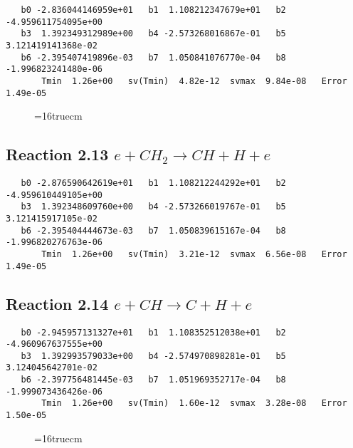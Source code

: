 \documentclass[12pt]{article}
\begin{document}
\begin{small}\begin{verbatim} 
   b0 -2.836044146959e+01   b1  1.108212347679e+01   b2 -4.959611754095e+00
   b3  1.392349312989e+00   b4 -2.573268016867e-01   b5  3.121419141368e-02
   b6 -2.395407419896e-03   b7  1.050841076770e-04   b8 -1.996823241480e-06
       Tmin  1.26e+00   sv(Tmin)  4.82e-12  svmax  9.84e-08   Error  1.49e-05
\end{verbatim}\end{small}

\begin{figure} \label{met.2_2.11}
\epsfxsize=16truecm
\end{figure}
\newpage
 
\subsection{ 
Reaction 2.13     $e + CH_2 \rightarrow CH + H + e$
}

\begin{small}\begin{verbatim} 
   b0 -2.876590642619e+01   b1  1.108212244292e+01   b2 -4.959610449105e+00
   b3  1.392348609760e+00   b4 -2.573266019767e-01   b5  3.121415917105e-02
   b6 -2.395404444673e-03   b7  1.050839615167e-04   b8 -1.996820276763e-06
       Tmin  1.26e+00   sv(Tmin)  3.21e-12  svmax  6.56e-08   Error  1.49e-05
\end{verbatim}\end{small}

\subsection{ 
Reaction 2.14     $e + CH \rightarrow C + H + e$
}

\begin{small}\begin{verbatim} 
   b0 -2.945957131327e+01   b1  1.108352512038e+01   b2 -4.960967637555e+00
   b3  1.392993579033e+00   b4 -2.574970898281e-01   b5  3.124045642701e-02
   b6 -2.397756481445e-03   b7  1.051969352717e-04   b8 -1.999073436426e-06
       Tmin  1.26e+00   sv(Tmin)  1.60e-12  svmax  3.28e-08   Error  1.50e-05
\end{verbatim}\end{small}

\begin{figure} \label{met.2_2.13}
\epsfxsize=16truecm
\end{figure}
\newpage
 
\end{document}
